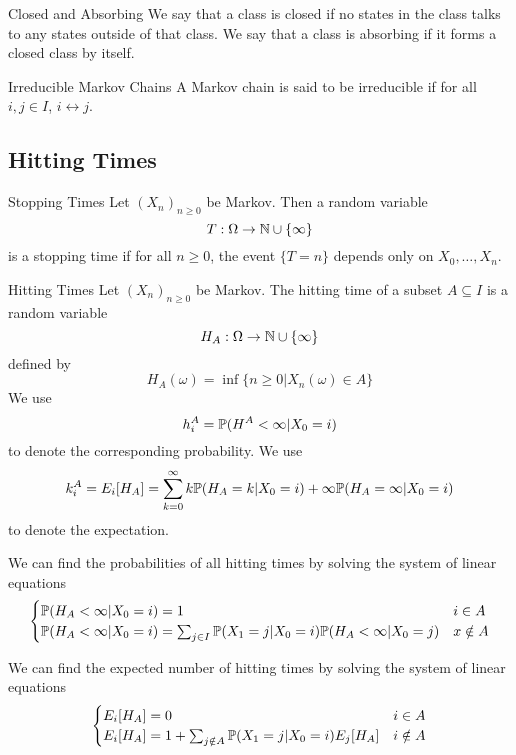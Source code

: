 \documentclass[a4paper]{article}
\begin{document}
\begin{defn}{Closed and Absorbing}{} We say that a class is closed if no states in the class talks to any states outside of that class. We say that a class is absorbing if it forms a closed class by itself. 
\end{defn}

\begin{defn}{Irreducible Markov Chains}{} A Markov chain is said to be irreducible if for all $i,j\in I$, $i\leftrightarrow j$. 
\end{defn}

\subsection{Hitting Times}
\begin{defn}{Stopping Times}{} Let $(X_n)_{n\geq 0}$ be Markov. Then a random variable $$T:\Omega\to\mathbb{N}\cup\{\infty\}$$ is a stopping time if for all $n\geq 0$, the event $\{T=n\}$ depends only on $X_0,\dots,X_n$. 
\end{defn}

\begin{defn}{Hitting Times}{} Let $(X_n)_{n\geq 0}$ be Markov. The hitting time of a subset $A\subseteq I$ is a random variable $$H_A:\Omega\to\mathbb{N}\cup\{\infty\}$$ defined by $$H_A(\omega)=\inf\{n\geq 0|X_n(\omega)\in A\}$$ We use $$h_i^A=\mathbb{P}(H^A<\infty|X_0=i)$$ to denote the corresponding probability. We use $$k_i^A=E_i[H_A]=\sum_{k=0}^\infty k\mathbb{P}(H_A=k|X_0=i)+\infty\mathbb{P}(H_A=\infty|X_0=i)$$ to denote the expectation. 
\end{defn}

\begin{prp}{}{} We can find the probabilities of all hitting times by solving the system of linear equations $$\begin{cases}
\mathbb{P}(H_A<\infty|X_0=i)=1 & i\in A\\
\mathbb{P}(H_A<\infty|X_0=i)=\sum_{j\in I}\mathbb{P}(X_1=j|X_0=i)\mathbb{P}(H_A<\infty|X_0=j) & x\notin A
\end{cases}$$
\end{prp}

\begin{prp}{}{} We can find the expected number of hitting times by solving the system of linear equations $$\begin{cases}
E_i[H_A]=0 & i\in A\\
E_i[H_A]=1+\sum_{j\notin A}\mathbb{P}(X_1=j|X_0=i)E_j[H_A] & i\notin A
\end{cases}$$
\end{prp}
\end{document}
